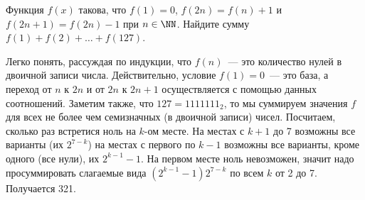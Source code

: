 Функция $f(x)$ такова, что
$f(1) = 0$, $f(2 n) = f(n) + 1$ и $f(2 n + 1) = f(2 n) - 1$ при $n \in \NN$.
Найдите сумму $f(1) + f(2) + \ldots + f(127)$.

\solution
Легко понять, рассуждая по индукции, что $f(n)$~--- это количество нулей в
двоичной записи числа.
Действительно, условие $f(1) = 0$~--- это база, а переход от $n$ к $2 n$ и
от $2 n$ к $2 n + 1$ осуществляется с помощью данных соотношений.
Заметим также, что $127 = 1111111_2$, то мы суммируем значения $f$ для всех
не более чем семизначных (в двоичной записи) чисел.
Посчитаем, сколько раз встретися ноль на $k$-ом месте.
На местах с $k + 1$ до 7 возможны все варианты (их $2^{7 - k}$) на местах с
первого по $k - 1$ возможны все варианты, кроме одного (все нули), их
$2^{k - 1} - 1$.
На первом месте ноль невозможен, значит надо просуммировать слагаемые вида
$(2^{k - 1} - 1) 2^{7 - k}$ по всем $k$ от 2 до 7.
Получается 321.

